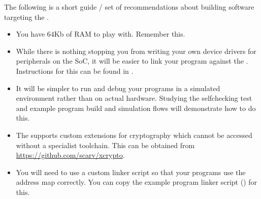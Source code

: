 
The following is a short guide / set of recommendations about building
software targeting the \SCARVSOC.

\begin{itemize}

\item You have $64$Kb of RAM to play with. Remember this.

\item While there is nothing stopping you from writing your own
    device drivers for peripherals on the SoC, it will be easier
    to link your program against the \SCARVSOC.
    Instructions for this can be found in .

\item It will be simpler to run and debug your programs in a simulated
    environment rather than on actual hardware.
    Studying the selfchecking test and example program build and
    simulation flows will demonstrate how to do this.

\item The \SCARVCPU supports custom extensions for cryptography
    which cannot be accessed without a specialist toolchain.
    This can be obtained from
    \url{https://github.com/scarv/xcrypto}.

\item You will need to use a custom linker script so that your programs
    use the \SCARVSOC address map correctly.
    You can copy the example program linker script
    ()
    for this.

\end{itemize}

